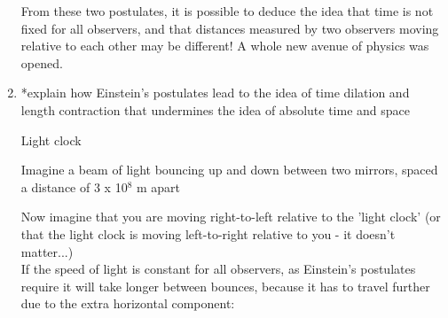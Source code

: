 \documentclass[main.tex]{subfiles}
\begin{document}
\begin{enumerate}
From these two postulates, it is possible to deduce the idea that time is not fixed for all observers, and that distances measured by two observers moving relative to each other may be different! A whole new avenue of physics was opened.

\item *explain how Einstein’s postulates lead to the idea of time dilation and length contraction that
undermines the idea of absolute time and space


Light clock

Imagine a beam of light bouncing up and down between two mirrors, spaced a distance of 3 x 10$^8$ m apart

\begin{figure}[h]
	\begin{center}
		
		
		\end{center}
\end{figure}

Now imagine that you are moving right-to-left relative to the 'light clock' (or that the light clock is moving left-to-right relative to you - it doesn't matter...)
\\

If the speed of light is constant for all observers, as Einstein's postulates require it will take longer between bounces, because it has to travel further due to the extra horizontal component:

 
\begin{figure}[h]
	\begin{center}	
	\end{center}
\end{figure}




\end{enumerate}
\end{document}
